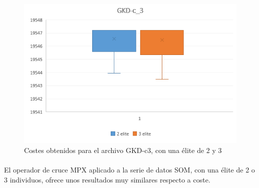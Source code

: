 	\begin{figure}[H]
		\centering
		\includegraphics[scale=0.7]{img/MPX_2vs3/GKD-c_3_Costes}
		\caption{Costes obtenidos para el archivo GKD-c3, con una élite de 2 y 3}
		\label{gkd-c3_coste}
		
		
	\end{figure}

		\paragraph{} El operador de cruce MPX aplicado a la serie de datos SOM, con una élite de 2 o 3 individuos, ofrece unos resultados muy similares respecto a coste.

